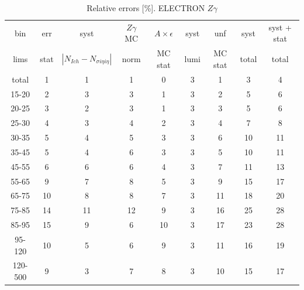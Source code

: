 \begin{table}[h]
  \scriptsize
  \begin{center}
  \caption{Relative errors [\%]. ELECTRON $Z\gamma$}
  \begin{tabular}{|c|c|c|c|c|c|c|c|c|}
    bin  & err & syst & $Z\gamma$ MC & $A\times \epsilon$ & syst & unf & syst & syst + stat\\
    lims  & stat & $|N_{Ich}-N_{\sigma{i\eta i\eta}}|$ & norm & MC stat & lumi & MC stat & total & total\\ \hline
    total  & 1 & 1 & 1 & 0 & 3 & 1 & 3 & 4 \\ \hline
    15-20 & 2 & 3 & 3 & 1 & 3 & 2 & 5 & 6 \\ \hline
    20-25 & 3 & 2 & 3 & 1 & 3 & 3 & 5 & 6 \\ \hline
    25-30 & 4 & 3 & 4 & 2 & 3 & 4 & 7 & 8 \\ \hline
    30-35 & 5 & 4 & 5 & 3 & 3 & 6 & 10 & 11 \\ \hline
    35-45 & 5 & 4 & 6 & 3 & 3 & 5 & 10 & 11 \\ \hline
    45-55 & 6 & 6 & 6 & 4 & 3 & 7 & 11 & 13 \\ \hline
    55-65 & 9 & 7 & 8 & 5 & 3 & 9 & 15 & 17 \\ \hline
    65-75 & 10 & 8 & 8 & 7 & 3 & 11 & 18 & 20 \\ \hline
    75-85 & 14 & 11 & 12 & 9 & 3 & 16 & 25 & 28 \\ \hline
    85-95 & 15 & 9 & 6 & 10 & 3 & 17 & 23 & 28 \\ \hline
    95-120 & 10 & 5 & 6 & 9 & 3 & 11 & 16 & 19 \\ \hline
    120-500 & 9 & 3 & 7 & 8 & 3 & 10 & 15 & 17 \\ \hline
  \end{tabular}
  \label{tab:systInPercent_ELECTRON_ZGamma}
  \end{center}
\end{table}

